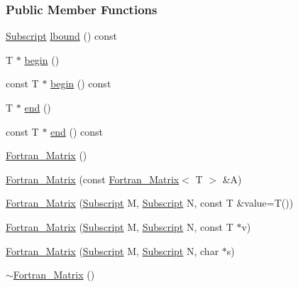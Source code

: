 \subsubsection*{Public Member Functions}
\begin{DoxyCompactItemize}
\item 
\hyperlink{namespace_t_n_t_af22e3f1460e145c04ce4e7d701e4c1c1}{Subscript} \hyperlink{class_t_n_t_1_1_fortran___matrix_a91f5948ba0431ff24a9f851c244ad704}{lbound} () const 
\item 
T $\ast$ \hyperlink{class_t_n_t_1_1_fortran___matrix_aab9f96e68cbc0e86b3280831c60b7d7c}{begin} ()
\item 
const T $\ast$ \hyperlink{class_t_n_t_1_1_fortran___matrix_a137c8a05787c8cb93116bf1bdb2555b3}{begin} () const 
\item 
T $\ast$ \hyperlink{class_t_n_t_1_1_fortran___matrix_aafa28303acb321910df4da7c9f0cd6b3}{end} ()
\item 
const T $\ast$ \hyperlink{class_t_n_t_1_1_fortran___matrix_a6b24a974cbeedd068cb870997830b27e}{end} () const 
\item 
\hyperlink{class_t_n_t_1_1_fortran___matrix_ac159102d1207e2510556b55662e29318}{Fortran\_\-Matrix} ()
\item 
\hyperlink{class_t_n_t_1_1_fortran___matrix_a2e80996d2fb607a64434bb63d39eb0ad}{Fortran\_\-Matrix} (const \hyperlink{class_t_n_t_1_1_fortran___matrix}{Fortran\_\-Matrix}$<$ T $>$ \&A)
\item 
\hyperlink{class_t_n_t_1_1_fortran___matrix_ac182cb9b997ba9fd88208c8af3e51014}{Fortran\_\-Matrix} (\hyperlink{namespace_t_n_t_af22e3f1460e145c04ce4e7d701e4c1c1}{Subscript} M, \hyperlink{namespace_t_n_t_af22e3f1460e145c04ce4e7d701e4c1c1}{Subscript} N, const T \&value=T())
\item 
\hyperlink{class_t_n_t_1_1_fortran___matrix_a10405bb46633aaf00bae6efa57bfa27d}{Fortran\_\-Matrix} (\hyperlink{namespace_t_n_t_af22e3f1460e145c04ce4e7d701e4c1c1}{Subscript} M, \hyperlink{namespace_t_n_t_af22e3f1460e145c04ce4e7d701e4c1c1}{Subscript} N, const T $\ast$v)
\item 
\hyperlink{class_t_n_t_1_1_fortran___matrix_ab3b32b7702be138d1a47567dd5f9f351}{Fortran\_\-Matrix} (\hyperlink{namespace_t_n_t_af22e3f1460e145c04ce4e7d701e4c1c1}{Subscript} M, \hyperlink{namespace_t_n_t_af22e3f1460e145c04ce4e7d701e4c1c1}{Subscript} N, char $\ast$s)
\item 
\hyperlink{class_t_n_t_1_1_fortran___matrix_ad54f5b9c50272a4c101531fa1f464309}{$\sim$Fortran\_\-Matrix} ()
\item 

\end{DoxyCompactItemize}
